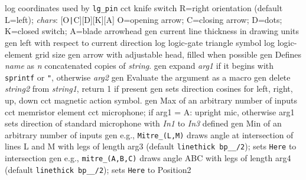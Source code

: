   {log}%
  {coordinates used by {\tt lg\_pin}}%
%
  {cct}%
  {knife switch R=right orientation (default L=left);
    {\sl chars}: [O{\tt|}C][D][K][A] O=opening arrow; C=closing arrow;
    D=dots; K=closed switch; A=blade arrowhead }%
%
  {gen}%
  {current line thickness in drawing units}%
%
  {gen}%
  {left with respect to current direction}%
%
  {log}%
  {logic-gate triangle symbol}%
%
  {log}%
  {logic-element grid size}%
%
%
%
  {gen}%
  {arrow with adjustable head, filled when possible}%
%
  {gen}%
  {Defines {\sl name} as {\sl n} concatenated copies of {\sl
  string}.}%
%
  {gen}%
  {expand {\sl arg1} if it begins
    with {\tt sprintf} or {\tt "}, otherwise {\sl arg2}}%
%
  {gen}%
  {Evaluate the argument as a macro}%
%
  {gen}%
  {delete {\sl string2} from {\sl string1}, return 1 if present}%
%
  {gen}%
  {sets direction cosines for left, right, up, down}%
%
  {cct}%
  {magnetic action symbol.}%
%
  {gen}%
  {Max of an arbitrary number of inputs}%
%
  {cct}%
  {memristor element}%
%
  {cct}%
  {microphone; if arg1 = A: upright mic, otherwise arg1 sets
  direction
   of standard microphone with {\sl In1} to {\sl In3} defined
   }%
%
  {gen}%
  {Min of an arbitrary number of inputs}%
%
  {gen}%
  {e.g., {\tt Mitre\_(L,M)} draws angle at intersection of lines
   L and M with legs of length arg3 (default {\tt linethick bp\_\_/2});
   sets {\tt Here} to intersection
    }%
%
  {gen}%
  {e.g., {\tt mitre\_(A,B,C)} draws angle ABC with legs
   of length arg4 (default {\tt linethick bp\_\_/2}); sets {\tt Here}%
   to Position2
    }%

